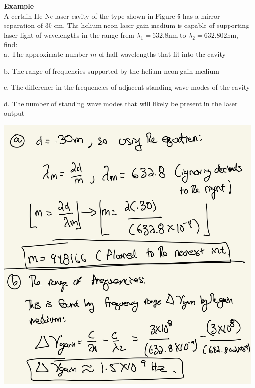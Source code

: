 \documentclass[10pt]{article}
\begin{document}
\textbf{Example} 
\\ \newblock
A certain He-Ne laser cavity of the type shown in Figure 6 has a mirror
separation of 30 cm. The helium-neon laser gain medium is capable of
supporting laser light of wavelengths in the range from $\lambda_1 = 632.8$nm to $\lambda_2 = 632.802$nm, find:
\\ \newblock
a. The approximate number $m$ of half-wavelengths that fit into the cavity

b. The range of frequencies supported by the helium-neon gain medium

c. The difference in the frequencies of adjacent standing wave modes of
the cavity

d. The number of standing wave modes that will likely be present in the
laser output

\begin{center}
    \includegraphics*[scale = .2]{imgs/cavity-example.jpeg}
\end{center}

\newpage
\end{document}

